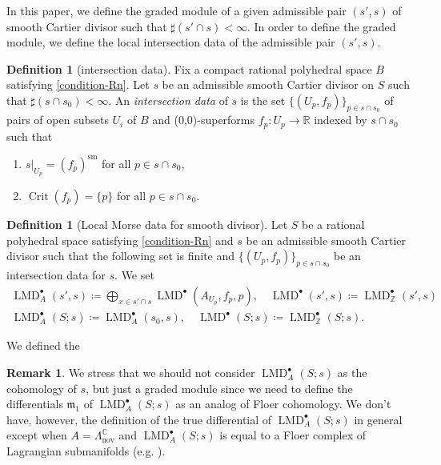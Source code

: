 \documentclass[a4paper,dvipdfmx,reqno,12pt]{amsart}
\theoremstyle{definition}
\newtheorem{definition}[theorem]{Definition}
\newtheorem{remark}[theorem]{Remark}
\newcommand{\deq}{\coloneqq}
\newcommand{\opn}[1]{\operatorname{#1}}
\numberwithin{equation}{section}
\begin{document}
In this paper, we
define the graded module of a given admissible pair 
$(s',s)$ of smooth Cartier divisor such that 
$\sharp (s'\cap s)<\infty$.
In order to define the graded module, we define the 
local intersection data of 
the admissible pair $(s',s)$.

\begin{definition}[{intersection data}]
Fix a compact rational polyhedral space $B$ satisfying 
\cref{condition-Rn}.
Let $s$ be an admissible smooth Cartier divisor 
on $S$ such that $\sharp (s\cap s_0)<\infty$. 
An \emph{intersection data} of $s$ is the set 
$\{(U_p,f_p)\}_{p\in s\cap s_0}$ of pairs of open subsets
$U_i$ of $B$ and (0,0)-superforms
$f_p\colon U_p \to \mathbb{R}$ indexed by 
$ s\cap s_0$ 
such that
\begin{enumerate}
\item $s|_{U_p}=(f_p)^{\mathrm{sm}}$
for all $p\in s\cap s_0$,
\item $\opn{Crit}(f_p)=\{p\}$ for all $p\in s\cap s_0$.
\end{enumerate}
\end{definition}


\begin{definition}[{Local Morse data for smooth divisor}]

Let $S$ be a rational polyhedral space 
satisfying \cref{condition-Rn} and 
$s$ be an admissible smooth Cartier divisor such that
the following set is finite and $\{(U_p,f_p)\}_{p\in s\cap s_0}$ 
be an intersection data for $s$.
We set
\begin{align}
\opn{LMD}^{\bullet}_{A}(s',s)\deq 
\bigoplus_{x\in s' \cap s} 
\opn{LMD}^{\bullet}(A_{U_p},f_{p},p), \quad 
\opn{LMD}^{\bullet}(s',s)
\deq \opn{LMD}^{\bullet}_{\mathbb{Z}}(s',s)\\
\opn{LMD}^{\bullet}_A(S;s)
\deq \opn{LMD}^{\bullet}_{A}(s_0,s), \quad
\opn{LMD}^{\bullet}(S;s)\deq
\opn{LMD}^{\bullet}_{\mathbb{Z}}(S;s).
\end{align}
\end{definition}

We defined the 

\begin{remark}
\label{remark-differential-graded-module}
We stress that we should not consider 
$\opn{LMD}^{\bullet}_{A}(S;s)$ as the cohomology of $s$,
but just
a graded module 
since we need to define the differentials 
$\mathfrak{m}_1$ of 
$\opn{LMD}^{\bullet}_{A}(S;s)$ as an analog of
Floer cohomology. We don't have, however,
the definition of the true differential of 
$\opn{LMD}^{\bullet}_A(S;s)$ in general except when 
$A=\Lambda_{\mathrm{nov}}^{\mathbb{C}}$ and
$\opn{LMD}^{\bullet}_{A}(S;s)$ is equal to a Floer complex
of Lagrangian submanifolds (e.g. \cite[5.2]{MR1882331}).
\end{remark}
\end{document}

